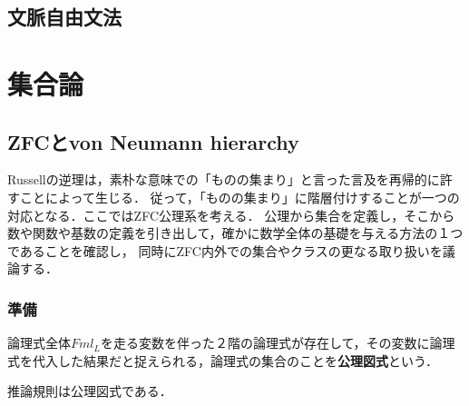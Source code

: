 \documentclass[uplatex, 12pt, dvipdfmx]{jsreport}
\begin{document}
\chapter{文脈自由文法}


\part{集合論}

\chapter{ZFCとvon Neumann hierarchy}

Russellの逆理は，素朴な意味での「ものの集まり」と言った言及を再帰的に許すことによって生じる．
従って，「ものの集まり」に階層付けすることが一つの対応となる．ここではZFC公理系を考える．
公理から集合を定義し，そこから数や関数や基数の定義を引き出して，確かに数学全体の基礎を与える方法の１つであることを確認し，
同時にZFC内外での集合やクラスの更なる取り扱いを議論する．

\section{準備}

\begin{definition}
    論理式全体$Fml_L$を走る変数を伴った２階の論理式が存在して，その変数に論理式を代入した結果だと捉えられる，論理式の集合のことを\textbf{公理図式}という．
\end{definition}
\begin{example}
    推論規則は公理図式である．
\end{example}
\end{document}
